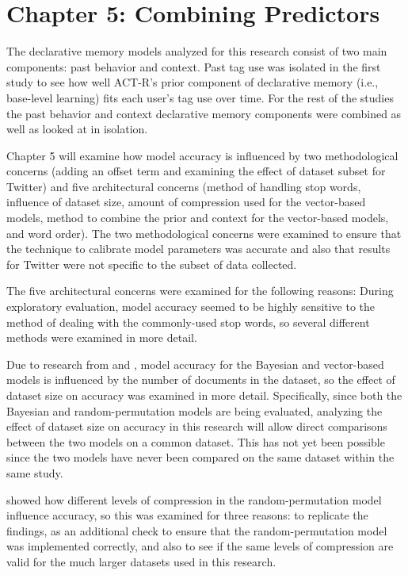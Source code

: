 \documentclass[man,floatsintext,donotrepeattitle]{apa6}
\begin{document}
\clearpage
\section{Chapter 5: Combining Predictors}

The declarative memory models analyzed for this research consist of two main components: past behavior and context.
Past tag use was isolated in the first study to see how well ACT-R's prior component of declarative memory (i.e., base-level learning) fits each user's tag use over time.
For the rest of the studies the past behavior and context declarative memory components were combined as well as looked at in isolation.

Chapter 5 will examine how model accuracy is influenced by two methodological concerns (adding an offset term and examining the effect of dataset subset for Twitter)
and five architectural concerns
(method of handling stop words, influence of dataset size, amount of compression used for the vector-based models, method to combine the prior and context for the vector-based models, and word order).
The two methodological concerns were examined to ensure that the technique to calibrate model parameters was accurate and also that results for Twitter were not specific to the subset of data collected. 

The five architectural concerns were examined for the following reasons:
During exploratory evaluation, model accuracy seemed to be highly sensitive to the method of dealing with the commonly-used stop words, so several different methods were examined in more detail.

Due to research from \textcite{Budiu2007} and \textcite{Recchia2010}, model accuracy for the Bayesian and vector-based models is influenced by the number of documents in the dataset,
so the effect of dataset size on accuracy was examined in more detail.
Specifically,
since both the Bayesian and random-permutation models are being evaluated, analyzing the effect of dataset size on accuracy in this research will allow direct comparisons between the two models on a common dataset.
This has not yet been possible since the two models have never been compared on the same dataset within the same study.

\textcite{Sahlgren2008} showed how different levels of compression in the random-permutation model influence accuracy, so this was examined for three reasons:
to replicate the findings,
as an additional check to ensure that the random-permutation model was implemented correctly, and also to see if the same levels of compression are valid for the much larger datasets used in this research.
\end{document}
